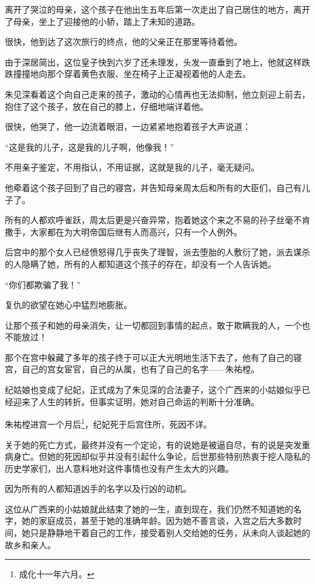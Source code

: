 \begin{multicols}{\theparacolNo}
离开了哭泣的母亲，这个孩子在他出生五年后第一次走出了自己居住的地方，离开了母亲，坐上了迎接他的小轿，踏上了未知的道路。

很快，他到达了这次旅行的终点，他的父亲正在那里等待着他。

由于深居简出，这位皇子快到六岁了还未理发，头发一直垂到了地上，他就这样跌跌撞撞地向那个穿着黄色衣服、坐在椅子上正凝视着他的人走去。

朱见深看着这个向自己走来的孩子，激动的心情再也无法抑制，他立刻迎上前去，抱住了这个孩子，放在自己的膝上，仔细地端详着他。

很快，他哭了，他一边流着眼泪，一边紧紧地抱着孩子大声说道：

“这是我的儿子，这是我的儿子啊，他像我！”

不用亲子鉴定，不用指认，不用证据，这就是我的儿子，毫无疑问。

他牵着这个孩子回到了自己的寝宫，并告知母亲周太后和所有的大臣们，自己有儿子了。

所有的人都欢呼雀跃，周太后更是兴奋异常，抱着她这个来之不易的孙子丝毫不肯撒手，大家都在为大明帝国后继有人而高兴，只有一个人例外。

后宫中的那个女人已经愤怒得几乎丧失了理智，派去堕胎的人敷衍了她，派去谋杀的人隐瞒了她，所有的人都知道这个孩子的存在，却没有一个人告诉她。

“你们都欺骗了我！”

复仇的欲望在她心中猛烈地膨胀。

让那个孩子和她的母亲消失，让一切都回到事情的起点，敢于欺瞒我的人，一个也不能放过！

那个在宫中躲藏了多年的孩子终于可以正大光明地生活下去了，他有了自己的寝宫，自己的宫女宦官，自己的从属，也有了自己的名字——朱祐樘。

纪姑娘也变成了纪妃，正式成为了朱见深的合法妻子，这个广西来的小姑娘似乎已经迎来了人生的转折。但事实证明，她对自己命运的判断十分准确。

朱祐樘进宫一个月后\footnote{成化十一年六月。}，纪妃死于后宫住所，死因不详。

关于她的死亡方式，最终并没有一个定论，有的说她是被逼自尽，有的说是突发重病身亡。但她的死因却似乎并没有引起什么争论，后世那些特别热衷于挖人隐私的历史学家们，出人意料地对这件事情也没有产生太大的兴趣。

因为所有的人都知道凶手的名字以及行凶的动机。

这位从广西来的小姑娘就此结束了她的一生，直到现在，我们仍然不知道她的名字，她的家庭成员，甚至于她的准确年龄。因为她不善言谈，入宫之后大多数时间，她只是静静地干着自己的工作，接受着别人交给她的任务，从未向人谈起她的故乡和亲人。


\end{multicols}
